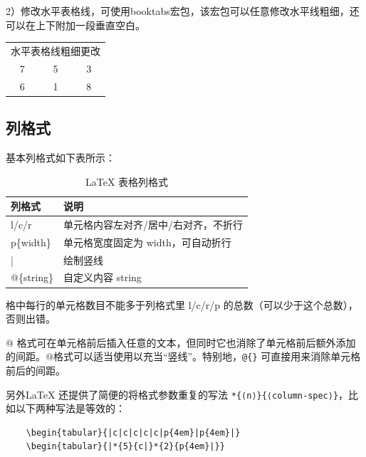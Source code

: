 2）修改水平表格线，可使用booktabs宏包，该宏包可以任意修改水平线粗细，还可以在上下附加一段垂直空白。

\begin{codeshow}
    \centering
    \begin{tabular}{|c|c|c|}
        \hline
        \multicolumn{3}{|c|}{水平表格线粗细更改} \\
        \specialrule{2pt}{0pt}{0pt}
        7 & 5 & 3                       \\
        \hline
        6 & 1 & 8                       \\
        \hline
    \end{tabular}
\end{codeshow}

\subsection{列格式}\label{sec:column-format}
\label{sec:liegeshi}

基本列格式如下表所示：

\begin{table}[htp]
    \centering
    \caption{\LaTeX{} 表格列格式}\label{tbl:table-column-spec}
    \begin{tabular}{*{2}{l}}
        \hline
        \textbf{列格式} & \textbf{说明}            \\
        \hline
        l/c/r        & 单元格内容左对齐/居中/右对齐，不折行    \\
        p\{width\}   & 单元格宽度固定为 {width}，可自动折行 \\
        |            & 绘制竖线                   \\
        @\{string\}  & 自定义内容 {string}         \\
        \hline
    \end{tabular}
\end{table}

格中每行的单元格数目不能多于列格式里 l/c/r/p 的总数（可以少于这个总数），否则出错。

@ 格式可在单元格前后插入任意的文本，但同时它也消除了单元格前后额外添加的间距。@格式可以适当使用以充当“竖线”。特别地，\lstinline|@{}| 可直接用来消除单元格前后的间距。

另外\LaTeX{} 还提供了简便的将格式参数重复的写法 \lstinline|*{⟨n⟩}{⟨column-spec⟩}|，比如以下两种写法是等效的：
\begin{lstlisting}
    \begin{tabular}{|c|c|c|c|c|p{4em}|p{4em}|}
    \begin{tabular}{|*{5}{c|}*{2}{p{4em}|}}
\end{lstlisting}



